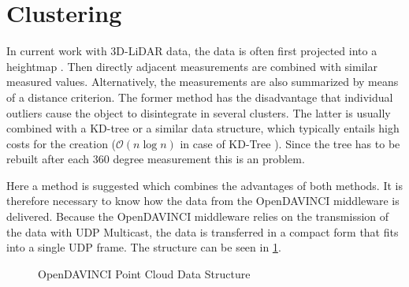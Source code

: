 \documentclass[11pt,oneside,openright]{mpreport}
\begin{document}
\section{Clustering}
In current work with 3D-LiDAR data, the data is often first projected into a heightmap \cite{Zhang,Himmelsbach2009,Li2016}. Then directly adjacent measurements are combined with similar measured values.
Alternatively, the measurements are also summarized by means of a distance criterion. 
The former method has the disadvantage that individual outliers cause the object to disintegrate in several clusters.
The latter is usually combined with a KD-tree or a similar data structure, which typically entails high costs for the creation ($\mathcal{O}(n\log n)$ in case of KD-Tree \cite{Bentley1975}).
Since the tree has to be rebuilt after each 360 degree measurement this is an problem.

Here a method is suggested which combines the advantages of both methods. It is therefore necessary to know how the data from the OpenDAVINCI
middleware is delivered. Because the OpenDAVINCI middleware relies on the transmission of the data with UDP Multicast, the data is transferred in a 
compact form that fits into a single UDP frame. The structure can be seen in \cref{odv_ds}.

\begin{figure}[!ht]
\caption{OpenDAVINCI Point Cloud Data Structure}
  \begin{center}
  \end{center}
\label{odv_ds}
\end{figure}
\end{document}
